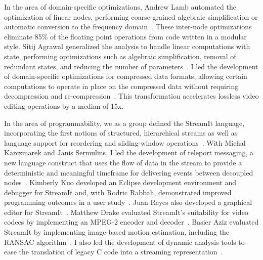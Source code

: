 
In the area of domain-specific optimizations, Andrew Lamb automated
the optimization of linear nodes, performing coarse-grained algebraic
simplification or automatic conversion to the frequency
domain~\cite{lamb-pldi03,lamb-thesis}.  These inter-node
optimizations eliminate 85\% of the floating point operations from
code written in a modular style.  Sitij Agrawal generalized the
analysis to handle linear computations with state, performing
optimizations such as algebraic simplification, removal of redundant
states, and reducing the number of
parameters~\cite{agrawal-cases05,agrawal-thesis}.  I led the
development of domain-specific optimizations for compressed data
formats, allowing certain computations to operate in place on the
compressed data without requiring decompression and
re-compression~\cite{thies-compression07}.  This transformation
accelerates lossless video editing operations by a median of 15x.

In the area of programmability, we as a group defined the StreamIt
language, incorporating the first notions of structured, hierarchical
streams as well as language support for reordering and sliding-window
operations~\cite{thies-cc02,thies-can02,amarasinghe-ijpp05}.  With
Michal Karczmarek and Janis Sermulins, I led the development of
teleport messaging, a new language construct that uses the flow of
data in the stream to provide a deterministic and meaningful timeframe
for delivering events between decoupled nodes~\cite{thies-ppopp05}.
Kimberly Kuo developed an Eclipse development environment and debugger
for StreamIt and, with Rodric Rabbah, demonstrated improved
programming outcomes in a user study~\cite{kuo05,kuo-thesis}.
Juan Reyes also developed a graphical editor for
StreamIt~\cite{reyes-thesis}.  Matthew Drake evaluated StreamIt's
suitability for video codecs by implementing an MPEG-2 encoder and
decoder~\cite{drake-ipdps06,drake-thesis}.  Basier Aziz evaluated
StreamIt by implementing image-based motion estimation, including the
RANSAC algorithm~\cite{aziz-thesis}.  I also led the development of
dynamic analysis tools to ease the translation of legacy C code into a
streaming representation~\cite{thies-micro07}.

